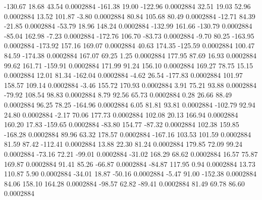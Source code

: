      -130.67       18.68       43.54     0.0002884
     -161.38       19.00     -122.96     0.0002884
       32.51       19.03       52.96     0.0002884
       13.52      101.87       -3.80     0.0002884
       80.84      105.68       80.49     0.0002884
      -12.71       84.39      -21.85     0.0002884
      -53.79       18.96      148.24     0.0002884
     -132.99      161.66     -130.79     0.0002884
      -85.04      162.98       -7.23     0.0002884
     -172.76      106.70      -83.73     0.0002884
       -9.70       80.25     -163.95     0.0002884
     -173.92      157.16      169.07     0.0002884
       40.63      174.35     -125.59     0.0002884
      100.47       84.59     -174.38     0.0002884
      167.07       69.25        1.25     0.0002884
      177.95       87.69       16.93     0.0002884
       99.62      161.71     -159.91     0.0002884
      171.99       91.24      156.10     0.0002884
      169.27       78.75       15.15     0.0002884
       12.01       81.34     -162.04     0.0002884
       -4.62       26.54     -177.83     0.0002884
      101.97      158.57      109.14     0.0002884
       -3.46      155.72      170.93     0.0002884
        3.91       75.21       93.88     0.0002884
      -79.92      108.54       98.83     0.0002884
        8.79       92.56       65.73     0.0002884
        0.28       26.66       88.49     0.0002884
       96.25       78.25     -164.96     0.0002884
        6.05       81.81       93.81     0.0002884
     -102.79       92.94       24.80     0.0002884
       -2.17       70.06      177.73     0.0002884
      102.08       20.13      166.94     0.0002884
      160.20       17.83     -159.65     0.0002884
      -83.80      154.77      -87.32     0.0002884
      102.38      159.85     -168.28     0.0002884
       89.96       63.32      178.57     0.0002884
     -167.16      103.53      101.59     0.0002884
       81.59       87.42     -112.41     0.0002884
       13.88       22.30       81.24     0.0002884
      179.85       72.09       99.24     0.0002884
      -73.16       72.21      -99.01     0.0002884
      -31.02      168.29       68.62     0.0002884
       16.57       75.87      169.87     0.0002884
       91.41       85.26      -66.87     0.0002884
      -84.87      117.95        0.94     0.0002884
       13.73      110.87        5.90     0.0002884
      -34.01       18.87      -50.16     0.0002884
       -5.47       91.00     -152.38     0.0002884
       84.06      158.10      164.28     0.0002884
      -98.57       62.82      -89.41     0.0002884
       81.49       69.78       86.60     0.0002884
